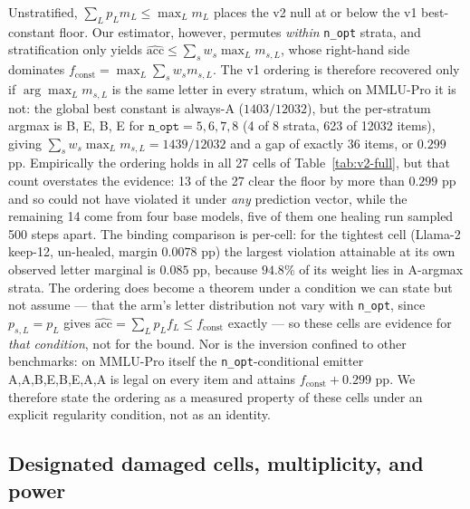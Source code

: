 Unstratified, $\sum_L p_{L}m_{L}\leq\max_Lm_{L}$ places the v2 null at or below the v1 best-constant floor. Our estimator, however, permutes \emph{within} \texttt{n\_opt} strata, and stratification only yields $\widehat{\mathrm{acc}}\leq\sum_s w_s\max_L m_{s,L}$, whose right-hand side dominates $f_{\mathrm{const}}=\max_L\sum_s w_s m_{s,L}$. The v1 ordering is therefore recovered only if $\arg\max_L m_{s,L}$ is the same letter in every stratum, which on MMLU-Pro it is not: the global best constant is always-A ($1403/12032$), but the per-stratum argmax is B, E, B, E for $\texttt{n\_opt}=5,6,7,8$ (4 of 8 strata, 623 of 12032 items), giving $\sum_s w_s\max_L m_{s,L}=1439/12032$ and a gap of exactly $36$ items, or $0.299$ pp. Empirically the ordering holds in all 27 cells of Table~\ref{tab:v2-full}, but that count overstates the evidence: 13 of the 27 clear the floor by more than $0.299$ pp and so could not have violated it under \emph{any} prediction vector, while the remaining 14 come from four base models, five of them one healing run sampled 500 steps apart. The binding comparison is per-cell: for the tightest cell (Llama-2 keep-12, un-healed, margin $0.0078$ pp) the largest violation attainable at its own observed letter marginal is $0.085$ pp, because $94.8\%$ of its weight lies in A-argmax strata. The ordering does become a theorem under a condition we can state but not assume --- that the arm's letter distribution not vary with \texttt{n\_opt}, since $p_{s,L}=p_{L}$ gives $\widehat{\mathrm{acc}}=\sum_L p_{L}f_{L}\leq f_{\mathrm{const}}$ exactly --- so these cells are evidence for \emph{that condition}, not for the bound. Nor is the inversion confined to other benchmarks: on MMLU-Pro itself the \texttt{n\_opt}-conditional emitter A,A,B,E,B,E,A,A is legal on every item and attains $f_{\mathrm{const}}+0.299$ pp. We therefore state the ordering as a measured property of these cells under an explicit regularity condition, not as an identity.



\FloatBarrier

\subsection{Designated damaged cells, multiplicity, and power}
\label{app:designated}

